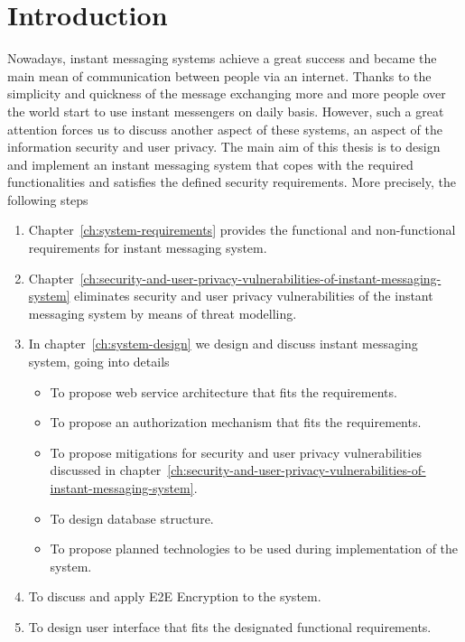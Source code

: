 \chapter{Introduction}\label{ch:introduction}
Nowadays, instant messaging systems achieve a great success and became the main mean of communication
between people via an internet.
Thanks to the simplicity and quickness of the message exchanging more and more people over the world start to use
instant messengers on daily basis.
However, such a great attention forces us to discuss another aspect of these systems, an aspect of the
information security and user privacy.
The main aim of this thesis is to design and implement an instant messaging system
that copes with the required functionalities and satisfies the defined security requirements.
More precisely, the following steps
\begin{enumerate}
    \item Chapter~\ref{ch:system-requirements} provides the functional and non-functional requirements for instant messaging system.
    \item Chapter~\ref{ch:security-and-user-privacy-vulnerabilities-of-instant-messaging-system}
    eliminates security and user privacy vulnerabilities of the instant messaging system by means of threat modelling.
    \item In chapter~\ref{ch:system-design} we design and discuss instant messaging system, going into details
    \begin{itemize}
        \item To propose web service architecture that fits the requirements.
        \item To propose an authorization mechanism that fits the requirements.
        \item To propose mitigations for security and user privacy vulnerabilities discussed
        in chapter~\ref{ch:security-and-user-privacy-vulnerabilities-of-instant-messaging-system}.
        \item To design database structure.
        \item To propose planned technologies to be used during implementation of the system.
    \end{itemize}
    \item To discuss and apply E2E Encryption to the system.
    \item To design user interface that fits the designated functional requirements.

\end{enumerate}
